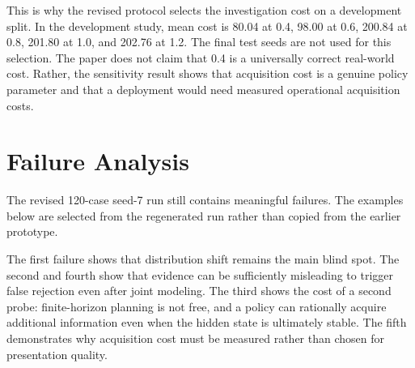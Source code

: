 \documentclass{article}
\begin{document}
This is why the revised protocol selects the investigation cost on a development split. In the development study, mean cost is 80.04 at 0.4, 98.00 at 0.6, 200.84 at 0.8, 201.80 at 1.0, and 202.76 at 1.2. The final test seeds are not used for this selection. The paper does not claim that 0.4 is a universally correct real-world cost. Rather, the sensitivity result shows that acquisition cost is a genuine policy parameter and that a deployment would need measured operational acquisition costs.

\section{Failure Analysis}

The revised 120-case seed-7 run still contains meaningful failures. The examples below are selected from the regenerated run rather than copied from the earlier prototype.

\begin{table}[t]
\centering
\scriptsize
{}
\caption{Representative failure cases from the revised benchmark.}
\end{table}


The first failure shows that distribution shift remains the main blind spot. The second and fourth show that evidence can be sufficiently misleading to trigger false rejection even after joint modeling. The third shows the cost of a second probe: finite-horizon planning is not free, and a policy can rationally acquire additional information even when the hidden state is ultimately stable. The fifth demonstrates why acquisition cost must be measured rather than chosen for presentation quality.
\end{document}
